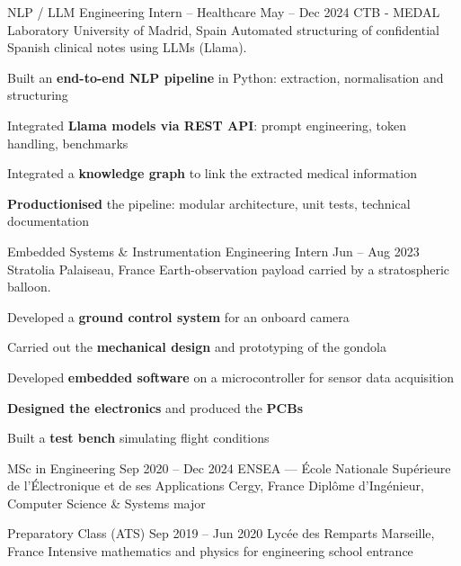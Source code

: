 \documentclass[10pt]{article}
\begin{document}
\begin{cvmain}
\begin{cvtimeline}
\cvsep
\cvexperience
  {NLP / LLM Engineering Intern -- Healthcare}
  {May -- Dec 2024}
  {CTB - MEDAL Laboratory}
  {University of Madrid, Spain}
  {Automated structuring of confidential Spanish clinical notes using LLMs (Llama).}
\begin{cvitems}
  \item Built an \textbf{end-to-end NLP pipeline} in Python: extraction, normalisation and structuring
  \item Integrated \textbf{Llama models via REST API}: prompt engineering, token handling, benchmarks
  \item Integrated a \textbf{knowledge graph} to link the extracted medical information
  \item \textbf{Productionised} the pipeline: modular architecture, unit tests, technical documentation
\end{cvitems}

\cvsep
\cvexperience
  {Embedded Systems \& Instrumentation Engineering Intern}
  {Jun -- Aug 2023}
  {Stratolia}
  {Palaiseau, France}
  {Earth-observation payload carried by a stratospheric balloon.}
\begin{cvitems}
  \item Developed a \textbf{ground control system} for an onboard camera
  \item Carried out the \textbf{mechanical design} and prototyping of the gondola
  \item Developed \textbf{embedded software} on a microcontroller for sensor data acquisition
  \item \textbf{Designed the electronics} and produced the \textbf{PCBs}
  \item Built a \textbf{test bench} simulating flight conditions
\end{cvitems}

\end{cvtimeline}

\begin{cvtimeline}

\cveducation
  {MSc in Engineering}
  {Sep 2020 -- Dec 2024}
  {ENSEA — École Nationale Supérieure de l’Électronique et de ses Applications}
  {Cergy, France}
  {Diplôme d’Ingénieur, Computer Science \& Systems major}

\cvsep
\cveducation
  {Preparatory Class (ATS)}
  {Sep 2019 -- Jun 2020}
  {Lycée des Remparts}
  {Marseille, France}
  {Intensive mathematics and physics for engineering school entrance}


\end{cvtimeline}
\end{cvmain}
\end{document}
